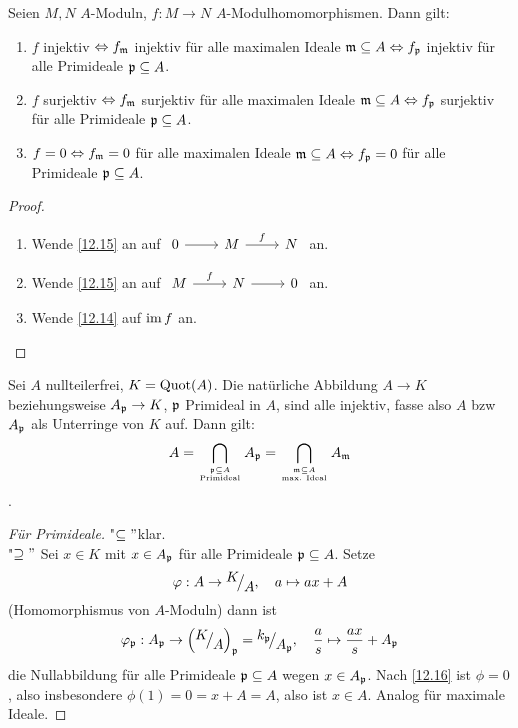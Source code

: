 \begin{fo} \label{12.16}
	Seien $M,N$ $A$-Moduln, $f: M \to N $ $A$-Modulhomomorphismen. Dann gilt: 
	\begin{enumerate} [label= \alph*)]
		\item $f$ injektiv $\Leftrightarrow f_{\mathfrak{m}} $ injektiv für alle maximalen Ideale $\mathfrak{m} \subseteq A  \Leftrightarrow f_{\mathfrak{p}} $ injektiv für alle Primideale $\mathfrak{p} \subseteq A $. 
		\item $f$ surjektiv $ \Leftrightarrow f_{\mathfrak{m}} $ surjektiv für alle maximalen Ideale $\mathfrak{m} \subseteq A  \Leftrightarrow f_{\mathfrak{p}} $ surjektiv für alle Primideale $\mathfrak{p} \subseteq A $. 
		\item $f = 0  \Leftrightarrow f_{\mathfrak{m}} = 0 $ für alle maximalen Ideale $\mathfrak{m} \subseteq A  \Leftrightarrow f_{\mathfrak{p}} = 0 $ für alle Primideale $\mathfrak{p} \subseteq A $. 
	\end{enumerate}
\end{fo}
\begin{proof}
	\begin{enumerate} [label= \alph*)]
		\item Wende \ref{12.15} an auf $\begin{tikzcd}	0 \arrow{r} & M \arrow{r}{f} & N
		\end{tikzcd}$ an.
		\item Wende \ref{12.15} an auf $\begin{tikzcd}	M \arrow{r}{f} & N \arrow{r} & 0
		\end{tikzcd}$ an.
		\item Wende \ref{12.14} auf $\operatorname{im} f $ an.
	\end{enumerate}
\end{proof}
\begin{bem} \label{12.17}
	Sei $A$ nullteilerfrei, $K = \operatorname{Quot}(A) $. Die natürliche Abbildung $A \to K $ beziehungsweise $A_{\mathfrak{p}} \to K $, $\mathfrak{p}$ Primideal in $A$, sind alle injektiv, fasse also $A$ bzw $A_{\mathfrak{p}} $ als Unterringe von $K$ auf. Dann gilt: $$ A = \bigcap_{\mathfrak{p} \subseteq A\atop \text{Primideal}} A_{\mathfrak{p}} = \bigcap_{\mathfrak{m} \subseteq A\atop \text{max. Ideal}} A_{\mathfrak{m}}$$.
\end{bem}
\begin{proof}[Für Primideale]
	"$\subseteq" $klar. \\
	"$\supseteq"$ Sei $ x \in K $ mit $x \in A_{\mathfrak{p}} $ für alle Primideale $ \mathfrak{p} \subseteq A $. Setze $$\phi: A \to \QR{K}{A}, \quad a \mapsto ax +A$$ (Homomorphismus von $A$-Moduln) dann ist
	$$\phi_{\p}: A_{\p} \to \left(\QR{K}{A}\right)_{\p} = \QR{k_{\p}}{A_{\p}} , \quad \frac{a}{s} \mapsto \frac{ax}{s} + A_\p$$
	die Nullabbildung für alle Primideale $\mathfrak{p}\subseteq A$ wegen $x\in A_{\mathfrak{p}}$. Nach \ref{12.16} ist $\phi=0$, also insbesondere $\phi(1) = 0=x+ A=A$, also ist $x\in A$. Analog für maximale Ideale.
\end{proof}
\newpage
